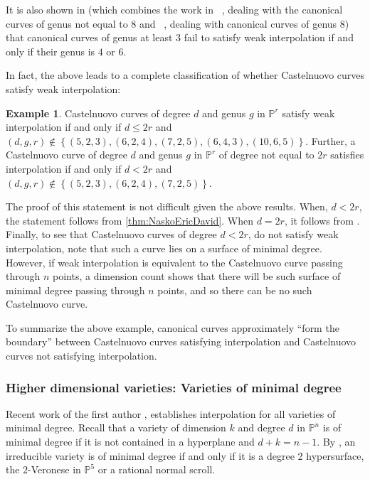 \documentclass[reqno, 11pt]{amsart}
\theoremstyle{definition}
\theoremstyle{remark}
\numberwithin{equation}{section}
\numberwithin{thm}{section}
\numberwithin{prop}{section}
\numberwithin{lem}{section}
\numberwithin{cor}{section}
\numberwithin{conj}{section}
\numberwithin{defn}{section}
\theoremstyle{plain}
\theoremstyle{definition}
\newtheorem{example}[theorem]{Example}
\newcommand\bp{{\mathbb P}}
\begin{document}
It is also shown in 
\cite[p.\ 108]{stevens:deformations-of-singularities}
(which combines the work in ~\cite{stevens:on-the-number-of-points-determining-a-canonical-curve},
dealing with the canonical curves of genus not equal to $8$ and
~\cite[Proposition, p.\ 3715]{stevens:on-the-computation-of-versal-deformations},
dealing with canonical curves of genus 8)
that canonical curves of genus at least $3$ fail to satisfy weak interpolation if and only if their genus is $4$ or $6$.

In fact, the above leads to a complete classification of
whether Castelnuovo curves satisfy weak interpolation:
\begin{example}
	\label{example:}
	Castelnuovo curves of degree $d$ and genus $g$ in $\bp^r$
	satisfy weak interpolation if and only if
	$d \leq 2r$ and
	$(d,g,r) \notin \left\{ (5,2,3), (6,2,4), (7,2,5), (6,4,3), (10,6,5) \right\}$.
	Further, a Castelnuovo curve of degree $d$ and genus $g$
	in $\bp^r$ of degree not equal
	to $2r$ satisfies interpolation if and only if
	$d < 2r$ and $(d,g,r) \notin \left\{ (5,2,3), (6,2,4), (7,2,5) \right\}$.

	The proof of this statement is not difficult given the above results.
	When, $d < 2r$, the statement follows from
	\autoref{thm:NaskoEricDavid}.
	When $d = 2r$, it follows from 
\cite[p.\ 108]{stevens:deformations-of-singularities}.
Finally, to see that Castelnuovo curves of degree $d < 2r$, do not
satisfy weak interpolation, note that such a curve lies on a surface of minimal degree. However, if weak interpolation is equivalent to the Castelnuovo
curve passing through $n$ points, a dimension count shows that there will be such surface 
of minimal degree passing through $n$ points, and so there can be no
such Castelnuovo curve.
\end{example}

To summarize the above example, canonical curves approximately
``form the boundary'' between Castelnuovo curves satisfying
interpolation and 
Castelnuovo curves not satisfying interpolation.



\subsubsection{Higher dimensional varieties: Varieties of minimal degree}

Recent work of the first author \cite{landesman:interpolation-of-varieties-of-minimal-degree}, establishes interpolation for all varieties of minimal degree. Recall
that a variety of dimension $k$ and degree $d$ in $\bp^n$
is of minimal degree
if it is not contained in a hyperplane and
$d + k = n - 1$.
By \cite[Theorem 1]{eisenbudH:on-varieties-of-minimal-degree}, an irreducible variety is of minimal degree if and only if
it is a degree 2 hypersurface, the $2$-Veronese in $\bp^5$
or a rational normal scroll.
\end{document}
